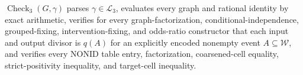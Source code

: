 \(\operatorname{Check}_3(G,\gamma)\) parses \(\gamma\in\mathcal L_3\), evaluates every graph and rational identity by exact arithmetic, verifies for every graph-factorization, conditional-independence, grouped-fixing, intervention-fixing, and odds-ratio constructor that each input and output divisor is \(q(A)\) for an explicitly encoded nonempty event \(A\subseteq\mathcal W\), and verifies every \(\mathrm{NONID}\) table entry, factorization, coarsened-cell equality, strict-positivity inequality, and target-cell inequality.